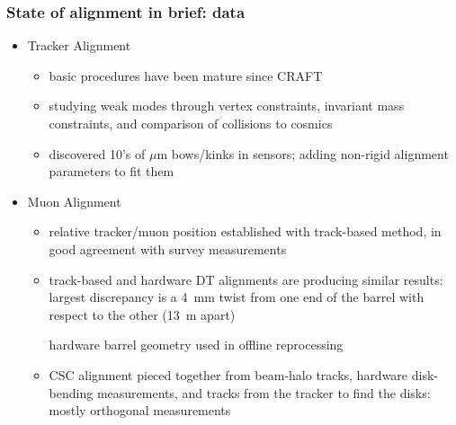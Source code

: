 \documentclass[compress]{beamer}
\begin{document}
\begin{frame}
\frametitle{State of alignment in brief: data}
\begin{itemize}
\item Tracker Alignment
\begin{itemize}
\item basic procedures have been mature since CRAFT
\item studying weak modes through vertex constraints, invariant mass
  constraints, and comparison of collisions to cosmics
\item discovered 10's of $\mu$m bows/kinks in sensors; adding
  non-rigid alignment parameters to fit them
\end{itemize}

\item Muon Alignment
\begin{itemize}
\item relative tracker/muon position established with track-based
  method, in good agreement with survey measurements
\item track-based and hardware DT alignments are producing similar
  results: largest discrepancy is a 4~mm twist from one end of the
  barrel with respect to the other (13~m apart)

\vspace{0.1 cm}
\hspace{0.5 cm}hardware barrel geometry used in offline reprocessing

\vspace{0.1 cm}
\item CSC alignment pieced together from beam-halo tracks, hardware
  disk-bending measurements, and tracks from the tracker to find the
  disks: mostly orthogonal measurements
\end{itemize}
\end{itemize}
\end{frame}
\end{document}
